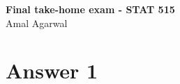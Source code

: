 \documentclass[12pt]{article}
\date{}
\begin{document}

\newtheorem{thm}{Theorem}[section]
\newtheorem{cor}[thm]{Corollary}
\newtheorem{lem}[thm]{Lemma}
\newtheorem{prop}[thm]{Proposition}
\newtheorem{defn}[thm]{Definition}
\newtheorem{exam}[thm]{Example}
\newtheorem{qstn}[thm]{Question}

\newpage
\begin{center}
{\bf Final take-home exam - STAT 515}\\
Amal Agarwal
\end{center}
\section*{Answer 1}
\end{document}
